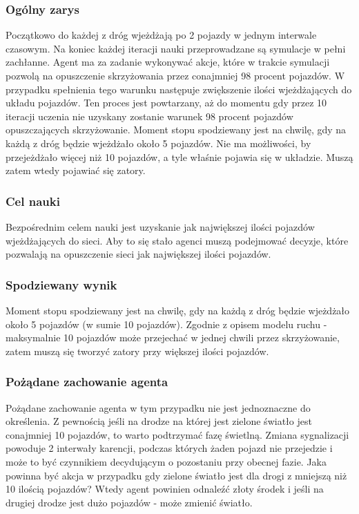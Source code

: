 \documentclass[12pt]{book}
\theoremstyle{plain}
\begin{document}
\subsubsection{Ogólny zarys}
Początkowo do każdej z dróg wjeżdżają po 2 pojazdy w jednym interwale czasowym. Na koniec każdej iteracji nauki przeprowadzane są symulacje w pełni zachłanne. Agent ma za zadanie wykonywać akcje, które w trakcie symulacji pozwolą na opuszczenie skrzyżowania przez conajmniej 98 procent pojazdów. W przypadku spełnienia tego warunku następuje zwiększenie ilości wjeżdżających do układu pojazdów. Ten proces jest powtarzany, aż do momentu gdy przez 10 iteracji uczenia nie uzyskany zostanie warunek 98 procent pojazdów opuszczających skrzyżowanie. Moment stopu spodziewany jest na chwilę, gdy na każdą z dróg będzie wjeżdżało około 5 pojazdów. Nie ma możliwości, by przejeżdżało więcej niż 10 pojazdów, a tyle właśnie pojawia się w układzie. Muszą zatem wtedy pojawiać się zatory.

\subsubsection{Cel nauki}
Bezpośrednim celem nauki jest uzyskanie jak największej ilości pojazdów wjeżdżających do sieci. Aby to się stało agenci muszą podejmować decyzje, które pozwalają na opuszczenie sieci jak największej ilości pojazdów. 
\subsubsection{Spodziewany wynik}
Moment stopu spodziewany jest na chwilę, gdy na każdą z dróg będzie wjeżdżało około 5 pojazdów (w sumie 10 pojazdów). Zgodnie z opisem modelu ruchu - maksymalnie 10 pojazdów może przejechać w jednej chwili przez skrzyżowanie, zatem muszą się tworzyć zatory przy większej ilości pojazdów.
\subsubsection{Pożądane zachowanie agenta}
Pożądane zachowanie agenta w tym przypadku nie jest jednoznaczne do określenia. Z pewnością jeśli na drodze na której jest zielone światło jest conajmniej 10 pojazdów, to warto podtrzymać fazę świetlną. Zmiana sygnalizacji powoduje 2 interwały karencji, podczas których żaden pojazd nie przejedzie i może to być czynnikiem decydującym o pozostaniu przy obecnej fazie. Jaka powinna być akcja w przypadku gdy zielone światło jest dla drogi z mniejszą niż 10 ilością pojazdów? Wtedy agent powinien odnaleźć złoty środek i jeśli na drugiej drodze jest dużo pojazdów - może zmienić światło. 
\end{document}
